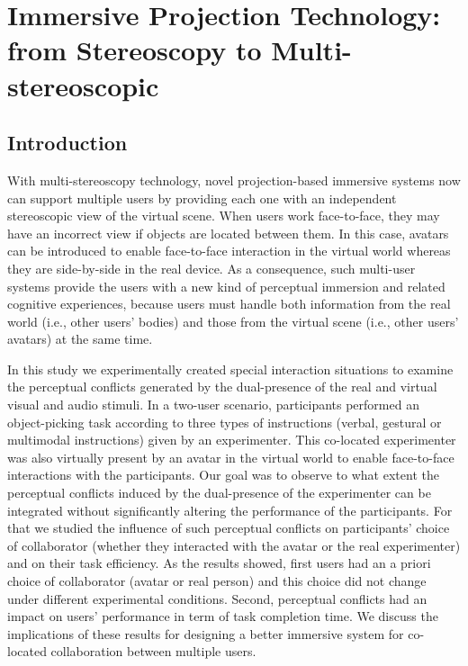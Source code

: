 \chapter{Immersive Projection Technology: from Stereoscopy to Multi-stereoscopic}
\label{chapter:multistereo}
\minitoc

\section{Introduction}
With multi-stereoscopy technology, novel projection-based immersive systems now can support multiple users by providing each one with an independent stereoscopic view of the virtual scene. When users work face-to-face, they may have an incorrect view if objects are located between them. In this case, avatars can be introduced to enable face-to-face interaction in the virtual world whereas they are side-by-side in the real device. As a consequence, such multi-user systems provide the users with a new kind of perceptual immersion and related cognitive experiences, because users must handle both information from the real world (i.e., other users' bodies) and those from the virtual scene (i.e., other users' avatars) at the same time.

In this study we experimentally created special interaction situations to examine the perceptual conflicts generated by the dual-presence of the real and virtual visual and audio stimuli. In a two-user scenario, participants performed an object-picking task according to three types of instructions (verbal, gestural or multimodal instructions) given by an experimenter. This co-located experimenter was also virtually present by an avatar in the virtual world to enable face-to-face interactions with the participants. Our goal was to observe to what extent the perceptual conflicts induced by the dual-presence of the experimenter can be integrated without significantly altering the performance of the participants. For that we studied the influence of such perceptual conflicts on participants' choice of collaborator (whether they interacted with the avatar or the real experimenter) and on their task efficiency. As the results showed, first users had an a priori choice of collaborator (avatar or real person) and this choice did not change under different experimental conditions. Second, perceptual conflicts had an impact on users' performance in term of task completion time. We discuss the implications of these results for designing a better immersive system for co-located collaboration between multiple users.

